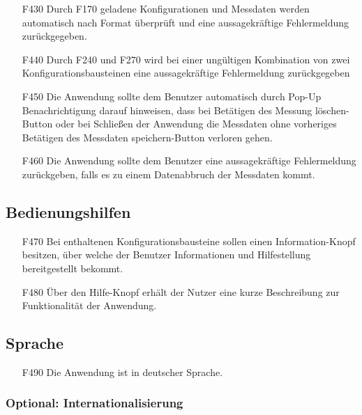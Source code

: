 \documentclass[parskip=full]{scrartcl}
\begin{document}
\begin{itemize}
\item[F430] Durch F170 geladene Konfigurationen und Messdaten werden automatisch nach Format überprüft und eine aussagekräftige Fehlermeldung zurückgegeben.
\item[F440] Durch F240 und F270 wird bei einer ungültigen Kombination von zwei Konfigurationsbausteinen eine aussagekräftige Fehlermeldung zurückgegeben
\item[F450] Die Anwendung sollte dem Benutzer automatisch durch Pop-Up Benachrichtigung darauf hinweisen, dass bei Betätigen des Messung löschen-Button oder bei Schließen der Anwendung die Messdaten ohne vorheriges Betätigen des Messdaten speichern-Button verloren gehen.
\item[F460] Die Anwendung sollte dem Benutzer eine aussagekräftige Fehlermeldung zurückgeben, falls es zu einem Datenabbruch der Messdaten kommt.

\end{itemize}



\subsection{Bedienungshilfen}

\begin{itemize}

\item[F470] Bei enthaltenen Konfigurationsbausteine sollen einen Information-Knopf besitzen, über welche der Benutzer Informationen und Hilfestellung bereitgestellt bekommt.
\item[F480] Über den Hilfe-Knopf erhält der Nutzer eine kurze Beschreibung zur Funktionalität der Anwendung.

\end{itemize}

\subsection{Sprache}

\begin{itemize}

\item[F490] Die Anwendung ist in deutscher Sprache.

\end{itemize}

\subsubsection{Optional: Internationalisierung}
\end{document}
